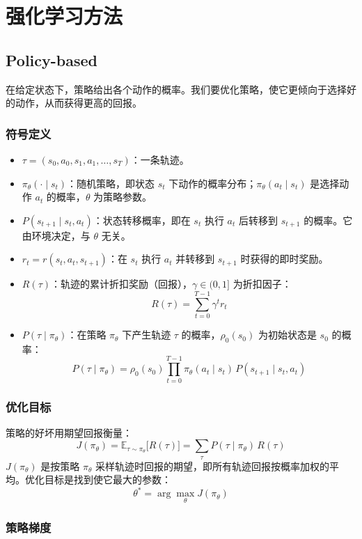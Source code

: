 \documentclass[UTF8,fontset=fandol]{ctexart}
\begin{document}
\section{强化学习方法}

\subsection{Policy-based}

在给定状态下，策略给出各个动作的概率。我们要优化策略，使它更倾向于选择好的动作，从而获得更高的回报。

\subsubsection{符号定义}

\begin{itemize}
  \item $\tau=(s_0,a_0,s_1,a_1,\dots,s_T)$：一条轨迹。
  \item $\pi_\theta(\cdot\mid s_t)$：随机策略，即状态 $s_t$ 下动作的概率分布；$\pi_\theta(a_t\mid s_t)$ 是选择动作 $a_t$ 的概率，$\theta$ 为策略参数。
  \item $P(s_{t+1}\mid s_t,a_t)$：状态转移概率，即在 $s_t$ 执行 $a_t$ 后转移到 $s_{t+1}$ 的概率。它由环境决定，与 $\theta$ 无关。
  \item $r_t=r(s_t,a_t,s_{t+1})$：在 $s_t$ 执行 $a_t$ 并转移到 $s_{t+1}$ 时获得的即时奖励。
  \item $R(\tau)$：轨迹的累计折扣奖励（回报），$\gamma\in(0,1]$ 为折扣因子：
  \[
  R(\tau)=\sum_{t=0}^{T-1}\gamma^t r_t
  \]
  \item $P(\tau\mid\pi_\theta)$：在策略 $\pi_\theta$ 下产生轨迹 $\tau$ 的概率，$\rho_0(s_0)$ 为初始状态是 $s_0$ 的概率：
  \[
  P(\tau\mid\pi_\theta)=\rho_0(s_0)\prod_{t=0}^{T-1}\pi_\theta(a_t\mid s_t)\,P(s_{t+1}\mid s_t,a_t)
  \]
\end{itemize}

\subsubsection{优化目标}

策略的好坏用期望回报衡量：
\[
J(\pi_\theta)=\mathbb{E}_{\tau\sim\pi_\theta}\big[R(\tau)\big]=\sum_{\tau}P(\tau\mid\pi_\theta)\,R(\tau)
\]
$J(\pi_\theta)$ 是按策略 $\pi_\theta$ 采样轨迹时回报的期望，即所有轨迹回报按概率加权的平均。优化目标是找到使它最大的参数：
\[
\theta^*=\arg\max_{\theta}J(\pi_\theta)
\]

\subsubsection{策略梯度}
\end{document}
